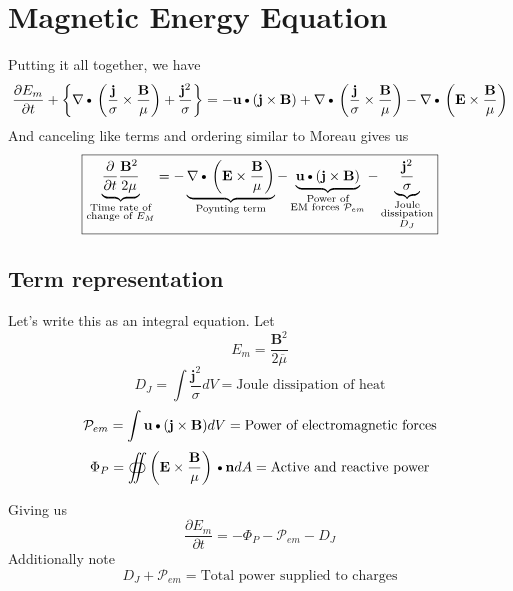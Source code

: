 \documentclass[11pt]{article}
\newcommand{\B}{\mathbf{B}}
\newcommand{\PD}{\partial}
\newcommand{\BM}{\frac{\mathbf{B}}{\mu}}
\newcommand{\J}{\mathbf{j}}
\newcommand{\E}{\mathbf{E}}
\newcommand{\N}{\mathbf{n}}
\newcommand{\JS}{\frac{\mathbf{j}}{\sigma}}
\newcommand{\JSS}{\frac{\mathbf{j}^2}{\sigma}}
\newcommand{\U}{\mathbf{u}}
\newcommand{\MO}{\overline{\mu}}
\newcommand{\DOT}{\text{\textbullet}}
\begin{document}
\section{Magnetic Energy Equation}
Putting it all together, we have
\begin{equation}
	\frac{\PD E_m}{\PD t} + 
	\left\{ \nabla \DOT \left(\JS \times \BM \right) + \JSS \right\} =
	- \U \DOT (\J \times \B) + 
	\nabla \DOT \left(\JS \times \BM \right) -
	\nabla \DOT \left(\E \times \BM \right)
\end{equation}
And canceling like terms and ordering similar to Moreau gives us
\begin{equation}
	\boxed{
	\underbrace{\frac{\PD }{\PD t} \frac{\B^2}{2 \mu}}_
	{\substack{\text{Time rate of}\\\text{change of $E_M$}}}
	=
	- \underbrace{\nabla \DOT \left(\E \times \BM \right)}_
	{\text{Poynting term}}
	- \underbrace{\U \DOT (\J \times \B)}_
	{\substack{\text{Power of}\\\text{EM forces $\mathcal P_{em}$}}}
	- \underbrace{\JSS}_
	{\substack{\text{Joule}\\\text{dissipation}\\\text{$D_J$}}}
	}
\end{equation}
\subsection{Term representation}
Let's write this as an integral equation. Let
\begin{equation}
	E_m = \frac{\B^2}{2 \MO}
\end{equation}
\begin{equation}
	D_J = \int \JSS dV = \text{Joule dissipation of heat}
\end{equation}
\begin{equation}
	\mathcal P_{em} = \int \U \DOT (\J \times \B) dV = \text{Power of electromagnetic forces}
\end{equation}
\begin{equation}
	\Phi_P = \oiint \left( \E \times \BM \right) \DOT \N dA = \text{Active and reactive power}
\end{equation}

Giving us
\begin{equation}
	\boxed{
	\frac{\PD E_m}{\PD t}
	=
	- \Phi_P
	- \mathcal P_{em}
	- D_J
	}
\end{equation}
Additionally note
\begin{equation}
	D_J + \mathcal P_{em} = \text{Total power supplied to charges}
\end{equation}
\end{document}

